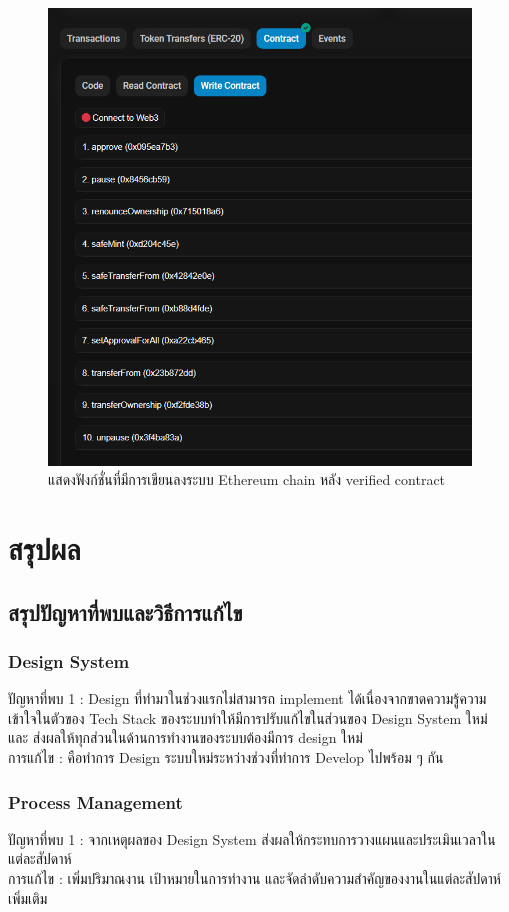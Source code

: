 \documentclass[12pt,oneside,openright,a4paper]{cpe-thai-project}
\begin{document}
\begin{figure}[!thb]
			\centering
			\includegraphics[scale=0.5]{etherscanWrite}
			\caption{แสดงฟังก์ชั่นที่มีการเขียนลงระบบ Ethereum chain หลัง verified contract}
		\end{figure}
\chapter{สรุปผล}
\section{ สรุปปัญหาที่พบและวิธีการแก้ไข}
\subsection{Design System}
\tab ปัญหาที่พบ 1 : Design ที่ทำมาในช่วงแรกไม่สามารถ implement ได้เนื่องจากขาดความรู้ความเข้าใจในตัวของ Tech Stack ของระบบทำให้มีการปรับแก้ไขในส่วนของ Design System ใหม่ และ ส่งผลให้ทุกส่วนในด้านการทำงานของระบบต้องมีการ design ใหม่\\
\tab การแก้ไข : คือทำการ Design ระบบใหม่ระหว่างช่วงที่ทำการ Develop ไปพร้อม ๆ กัน

\subsection{Process Management}
\tab ปัญหาที่พบ 1 : จากเหตุผลของ Design System ส่งผลให้กระทบการวางแผนและประเมินเวลาในแต่ละสัปดาห์ \\
\tab การแก้ไข : เพิ่มปริมาณงาน เป้าหมายในการทำงาน และจัดลำดับความสำคัญของงานในแต่ละสัปดาห์เพิ่มเติม 
\end{document}
